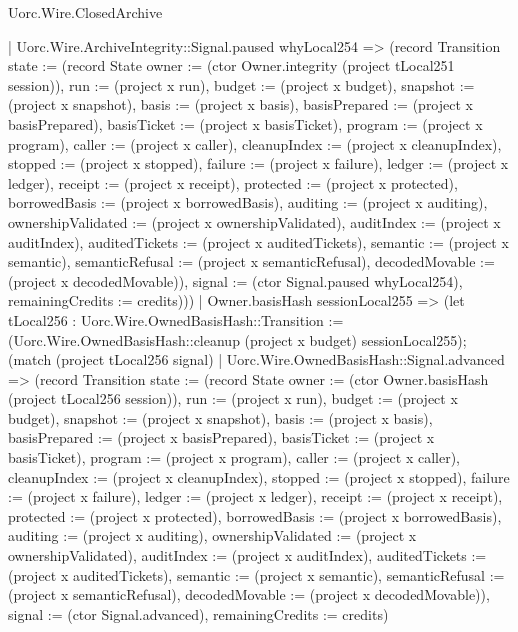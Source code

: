 \begin{lexlean}{Uorc.Wire.ClosedArchive}
\begin{semanticmodule}
{      | Uorc.Wire.ArchiveIntegrity::Signal.paused whyLocal254 => (record Transition {state := (record State {owner := (ctor Owner.integrity (project tLocal251 session)), run := (project x run), budget := (project x budget), snapshot := (project x snapshot), basis := (project x basis), basisPrepared := (project x basisPrepared), basisTicket := (project x basisTicket), program := (project x program), caller := (project x caller), cleanupIndex := (project x cleanupIndex), stopped := (project x stopped), failure := (project x failure), ledger := (project x ledger), receipt := (project x receipt), protected := (project x protected), borrowedBasis := (project x borrowedBasis), auditing := (project x auditing), ownershipValidated := (project x ownershipValidated), auditIndex := (project x auditIndex), auditedTickets := (project x auditedTickets), semantic := (project x semantic), semanticRefusal := (project x semanticRefusal), decodedMovable := (project x decodedMovable)}), signal := (ctor Signal.paused whyLocal254), remainingCredits := credits})))
    | Owner.basisHash sessionLocal255 => (let tLocal256 : Uorc.Wire.OwnedBasisHash::Transition := (Uorc.Wire.OwnedBasisHash::cleanup (project x budget) sessionLocal255); (match (project tLocal256 signal)
      | Uorc.Wire.OwnedBasisHash::Signal.advanced => (record Transition {state := (record State {owner := (ctor Owner.basisHash (project tLocal256 session)), run := (project x run), budget := (project x budget), snapshot := (project x snapshot), basis := (project x basis), basisPrepared := (project x basisPrepared), basisTicket := (project x basisTicket), program := (project x program), caller := (project x caller), cleanupIndex := (project x cleanupIndex), stopped := (project x stopped), failure := (project x failure), ledger := (project x ledger), receipt := (project x receipt), protected := (project x protected), borrowedBasis := (project x borrowedBasis), auditing := (project x auditing), ownershipValidated := (project x ownershipValidated), auditIndex := (project x auditIndex), auditedTickets := (project x auditedTickets), semantic := (project x semantic), semanticRefusal := (project x semanticRefusal), decodedMovable := (project x decodedMovable)}), signal := (ctor Signal.advanced), remainingCredits := credits})
}
\end{semanticmodule}
\end{lexlean}
